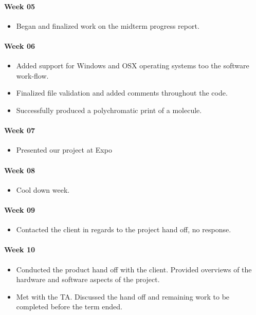 \paragraph{Week 05}
\begin{itemize}
\item Began and finalized work on the midterm progress report.
\end{itemize}
\paragraph{Week 06}
\begin{itemize}
\item Added support for Windows and OSX operating systems too the software work-flow.
\item Finalized file validation and added comments throughout the code.
\item Successfully produced a polychromatic print of a molecule.
\end{itemize}
\paragraph{Week 07}
\begin{itemize}
\item Presented our project at Expo
\end{itemize}
\paragraph{Week 08}
\begin{itemize}
\item Cool down week.
\end{itemize}
\paragraph{Week 09}
\begin{itemize}
\item Contacted the client in regards to the project hand off, no response.
\end{itemize}
\paragraph{Week 10}
\begin{itemize}
\item Conducted the product hand off with the client. Provided overviews of the hardware and software aspects of the project.
\item Met with the TA. Discussed the hand off and remaining work to be completed before the term ended.
\end{itemize}
